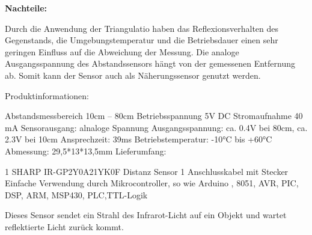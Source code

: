 \par\bigskip %
\textbf{Nachteile:}  %

Durch die Anwendung der Triangulatio haben das Reflexionsverhalten des Gegenstands, die Umgebungstemperatur und die Betriebsdauer einen sehr geringen Einfluss auf die Abweichung der Messung. Die analoge Ausgangsspannung des Abstandssensors hängt von der gemessenen Entfernung ab. Somit kann der Sensor auch als Näherungssensor genutzt werden.

Produktinformationen:

Abstandsmessbereich 10cm – 80cm
Betriebsspannung 5V DC
Stromaufnahme 40 mA
Sensorausgang: alnaloge Spannung
Ausgangsspannung: ca. 0.4V bei 80cm, ca. 2.3V bei 10cm
Ansprechzeit: 39ms
Betriebstemperatur: -10°C bis +60°C
Abmessung: 29,5*13*13,5mm
Lieferumfang:

1 SHARP IR-GP2Y0A21YK0F Distanz Sensor
1 Anschlusskabel mit Stecker
Einfache Verwendung durch Mikrocontroller, so wie Arduino , 8051, AVR, PIC, DSP, ARM, MSP430, PLC,TTL-Logik


Dieses Sensor sendet ein Strahl des Infrarot-Licht auf ein Objekt und wartet  reflektierte Licht zurück kommt.


\newpage
